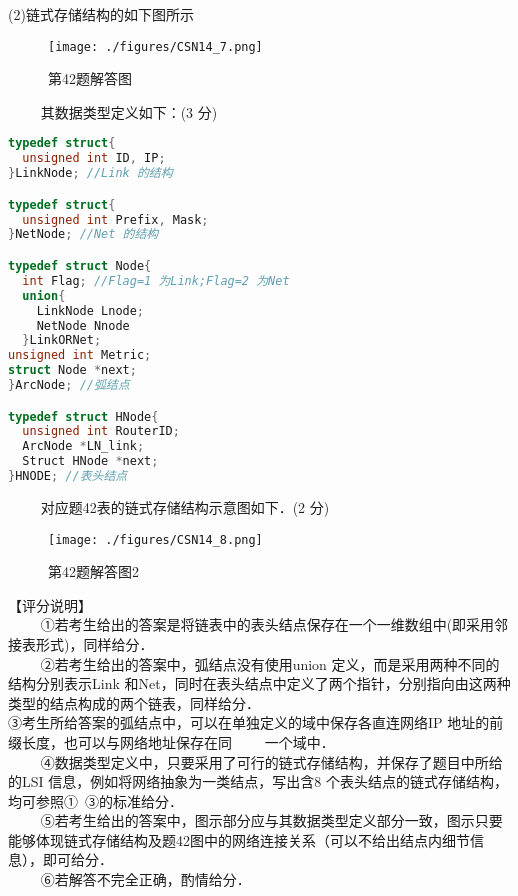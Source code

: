 (2)链式存储结构的如下图所示
\begin{figure}[ht]
\centering
\texttt{[image: ./figures/CSN14\_7.png]}
\caption{第42题解答图} \label{CSN14_fig7}
\end{figure}
$\qquad$ 其数据类型定义如下：(3 分) \\
\begin{lstlisting}[language=cpp]
typedef struct{
  unsigned int ID, IP;
}LinkNode; //Link 的结构

typedef struct{
  unsigned int Prefix, Mask;
}NetNode; //Net 的结构

typedef struct Node{
  int Flag; //Flag=1 为Link;Flag=2 为Net
  union{
    LinkNode Lnode;
    NetNode Nnode
  }LinkORNet;
unsigned int Metric;
struct Node *next;
}ArcNode; //弧结点

typedef struct HNode{
  unsigned int RouterID;
  ArcNode *LN_link;
  Struct HNode *next;
}HNODE; //表头结点
\end{lstlisting}
$\qquad$ 对应题42表的链式存储结构示意图如下．(2 分)
\begin{figure}[ht]
\centering
\texttt{[image: ./figures/CSN14\_8.png]}
\caption{第42题解答图2} \label{CSN14_fig8}
\end{figure}
【评分说明】 \\
$\qquad$ ①若考生给出的答案是将链表中的表头结点保存在一个一维数组中(即采用邻接表形式)，同样给分．  \\
$\qquad$ ②若考生给出的答案中，弧结点没有使用union 定义，而是采用两种不同的结构分别表示Link 和Net，同时在表头结点中定义了两个指针，分别指向由这两种类型的结点构成的两个链表，同样给分． \\
③考生所给答案的弧结点中，可以在单独定义的域中保存各直连网络IP 地址的前缀长度，也可以与网络地址保存在同$\qquad$ 一个域中． \\
$\qquad$ ④数据类型定义中，只要采用了可行的链式存储结构，并保存了题目中所给的LSI 信息，例如将网络抽象为一类结点，写出含8 个表头结点的链式存储结构，均可参照①~③的标准给分． \\
$\qquad$ ⑤若考生给出的答案中，图示部分应与其数据类型定义部分一致，图示只要能够体现链式存储结构及题42图中的网络连接关系（可以不给出结点内细节信息），即可给分． \\
$\qquad$ ⑥若解答不完全正确，酌情给分．

